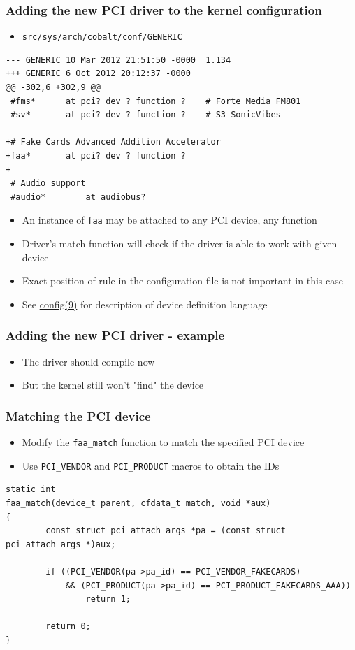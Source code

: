 \documentclass[dvipsnames,table]{beamer}
\begin{document}
\begin{frame}[fragile]
\frametitle{Adding the new PCI driver to the kernel configuration}
\scriptsize
\begin{itemize}
	\item {\tt src/sys/arch/cobalt/conf/GENERIC}
\end{itemize}
\begin{verbatim}
--- GENERIC	10 Mar 2012 21:51:50 -0000	1.134
+++ GENERIC	6 Oct 2012 20:12:37 -0000
@@ -302,6 +302,9 @@
 #fms*		at pci? dev ? function ?	# Forte Media FM801
 #sv*		at pci? dev ? function ?	# S3 SonicVibes
 
+# Fake Cards Advanced Addition Accelerator
+faa*		at pci? dev ? function ?
+
 # Audio support
 #audio*		at audiobus?
\end{verbatim}
\begin{itemize}
	\item An instance of {\tt faa} may be attached to any PCI device, any function
	\item Driver's match function will check if the driver is able to work with given device
	\item Exact position of rule in the configuration file is not important in this case
	\item See \href{http://netbsd.gw.com/cgi-bin/man-cgi?config+9+NetBSD-current}{config(9)} for description of device definition language
\end{itemize}
\end{frame}

\begin{frame}
\frametitle{Adding the new PCI driver - example}
\begin{itemize}
	\item The driver should compile now
	\item But the kernel still won't "find" the device
\end{itemize}
\end{frame}

\begin{frame}[fragile]
\frametitle{Matching the PCI device}
\begin{itemize}
	\item Modify the {\tt faa\_match} function to match the specified PCI device
	\item Use {\tt PCI\_VENDOR} and {\tt PCI\_PRODUCT} macros to obtain the IDs
\end{itemize}
\scriptsize
\begin{lstlisting}
static int
faa_match(device_t parent, cfdata_t match, void *aux)
{
        const struct pci_attach_args *pa = (const struct pci_attach_args *)aux;

        if ((PCI_VENDOR(pa->pa_id) == PCI_VENDOR_FAKECARDS) 
            && (PCI_PRODUCT(pa->pa_id) == PCI_PRODUCT_FAKECARDS_AAA))
                return 1;

        return 0;
}
\end{lstlisting}
\end{frame}
\end{document}
